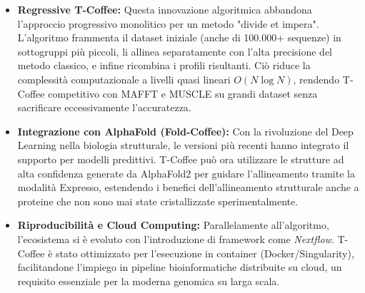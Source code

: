 \begin{itemize}
    \item \textbf{Regressive T-Coffee:} Questa innovazione algoritmica abbandona l'approccio progressivo monolitico per un metodo "divide et impera". L'algoritmo frammenta il dataset iniziale (anche di 100.000+ sequenze) in sottogruppi più piccoli, li allinea separatamente con l'alta precisione del metodo classico, e infine ricombina i profili risultanti. Ciò riduce la complessità computazionale a livelli quasi lineari $O(N \log N)$, rendendo T-Coffee competitivo con MAFFT e MUSCLE su grandi dataset senza sacrificare eccessivamente l'accuratezza.
    
    \item \textbf{Integrazione con AlphaFold (Fold-Coffee):} Con la rivoluzione del Deep Learning nella biologia strutturale, le versioni più recenti hanno integrato il supporto per modelli predittivi. T-Coffee può ora utilizzare le strutture ad alta confidenza generate da AlphaFold2 per guidare l'allineamento tramite la modalità Expresso, estendendo i benefici dell'allineamento strutturale anche a proteine che non sono mai state cristallizzate sperimentalmente.
    
    \item \textbf{Riproducibilità e Cloud Computing:} Parallelamente all'algoritmo, l'ecosistema si è evoluto con l'introduzione di framework come \textit{Nextflow}. T-Coffee è stato ottimizzato per l'esecuzione in container (Docker/Singularity), facilitandone l'impiego in pipeline bioinformatiche distribuite su cloud, un requisito essenziale per la moderna genomica su larga scala.
\end{itemize}